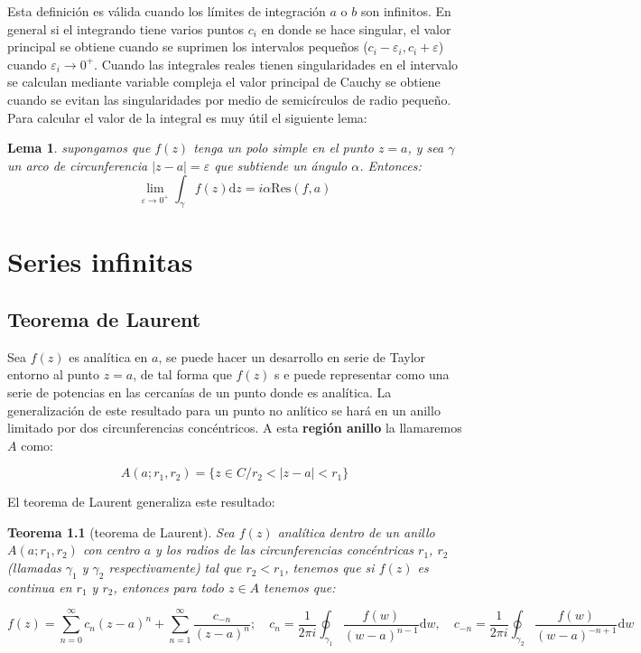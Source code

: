 \documentclass[12pt,a4paper]{book}
\newcommand{\D}{\mathrm{d}}
\newcommand{\Res}{\mathrm{Res}}
\newtheorem{theorem}{Teorema}[section]
\newtheorem{lemma}{Lema}[section]
\begin{document}
Esta definición es válida cuando los límites de integración $a$ o $b$ son infinitos. En general si el integrando tiene varios puntos $c_i$ en donde se hace singular, el valor principal se obtiene cuando se suprimen los intervalos pequeños ($ c_i - \varepsilon_i, c_i + \varepsilon $) cuando $\varepsilon_i \rightarrow 0^+$. Cuando las integrales reales tienen singularidades en el intervalo se calculan mediante variable compleja el valor principal de Cauchy se obtiene cuando se evitan las singularidades por medio de semicírculos de radio pequeño.  Para calcular el valor de la integral es muy útil el siguiente lema: %

\begin{lemma}
supongamos que $f(z)$ tenga un polo simple en el punto $z=a$, y sea $\gamma$ un arco de circunferencia $|z-a|=\varepsilon$ que subtiende un ángulo $\alpha$. Entonces:
$$ \lim_{\varepsilon \rightarrow 0^+} \int_{\gamma} f(z) \D z = i \alpha \Res(f,a) $$
\end{lemma}


\newpage

\chapter{Series infinitas}

\section{Teorema de Laurent}

Sea $f(z)$ es analítica en $a$, se puede hacer un desarrollo en serie de Taylor entorno al punto $z=a$, de tal forma que $f(z)$ s e puede representar como una serie de potencias en las cercanías de un punto donde es analítica. La generalización de este resultado para un punto no anlítico se hará en un anillo limitado por dos circunferencias concéntricos. A esta \textbf{región anillo} la llamaremos $A$ como:

$$ A(a;r_1,r_2) = \{  z \in C / r_2 < |z-a| < r_1 \} $$

El teorema de Laurent generaliza este resultado:

\begin{theorem}[teorema de Laurent]
Sea $f(z)$ analítica dentro de un anillo $A(a;r_1,r_2)$ con centro $a$ y los radios de las circunferencias concéntricas $r_1$, $r_2$ (llamadas $\gamma_1$ y $\gamma_2$ respectivamente) tal que $r_2 < r_1$, tenemos que si $f(z)$ es continua en $r_1$ y $r_2$, entonces para todo $z \in A$ tenemos que: %

$$ f(z) = \sum_{n=0}^{\infty} c_n (z-a)^n + \sum_{n=1}^{\infty} \frac{c_{-n}}{(z-a)^n}; \quad c_n = \dfrac{1}{2 \pi i} \oint_{\gamma_1} \dfrac{f(w)}{(w-a)^{n-1}} \D w, \quad c_{-n} = \dfrac{1}{2 \pi i} \oint_{\gamma_2} \dfrac{f(w)}{(w-a)^{-n+1}} \D w  $$
\end{theorem}
\end{document}
